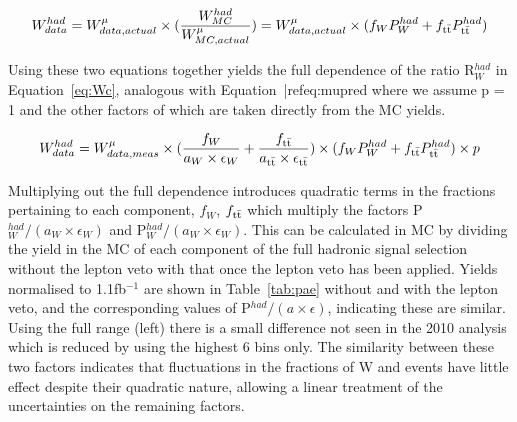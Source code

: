 \begin{equation}
W^{had}_{data} = W^{\mu}_{data, actual } \times (\frac{W^{had}_{MC}}{W^{\mu}_{MC, actual}}) = W^{\mu}_{data, actual } \times (f_{W} P^{had}_{W} + f_{\textrm{t}\bar{\textrm{t}}} P^{had}_{\textrm{t}\bar{\textrm{t}}})
\label{eq:Wb}
\end{equation}

Using these two equations together yields the full dependence of the ratio R$^{had}_{W}$ in Equation~\ref{eq:Wc}, analogous with Equation~|ref{eq:mupred} where we assume p = 1 and the other factors of which are taken directly from the MC yields.

\begin{equation}
W^{had}_{data} = W^{\mu}_{data, meas} \times (\frac{f_{W}}{a_{W} \times \epsilon_{W}} + \frac{f_{\textrm{t}\bar{\textrm{t}}}}{a_{\textrm{t}\bar{\textrm{t}}} \times \epsilon_{\textrm{t}\bar{\textrm{t}}}}) \times (f_{W} P^{had}_{W} + f_{\textrm{t}\bar{\textrm{t}}} P^{had}_{\textrm{t}\bar{\textrm{t}}}) \times p
\label{eq:Wc}
\end{equation}

 Multiplying out the full dependence introduces quadratic terms in the fractions pertaining to each component, $f_{W}$, $f_{\textrm{t}\bar{\textrm{t}}}$ which multiply the factors P$^{had}_{W}/(a_{W} \times \epsilon_{W})$ and P$^{had}_{W}/(a_{W} \times \epsilon_{W})$. This can be calculated in MC by dividing the yield in the MC of each component of the full hadronic signal selection without the lepton veto with that once the lepton veto has been applied. Yields normalised to 1.1fb$^{-1}$ are shown in Table~\ref{tab:pae} without and with the lepton veto, and the corresponding values of P$^{had}/(a \times \epsilon)$, indicating these are similar. Using the full \HT range (left) there is a small difference not seen in the 2010 analysis which is reduced by using the highest 6 bins only. The similarity between these two factors indicates that fluctuations in the fractions of W and \tto events have little effect despite their quadratic nature, allowing a linear treatment of the uncertainties on the remaining factors. 
 
